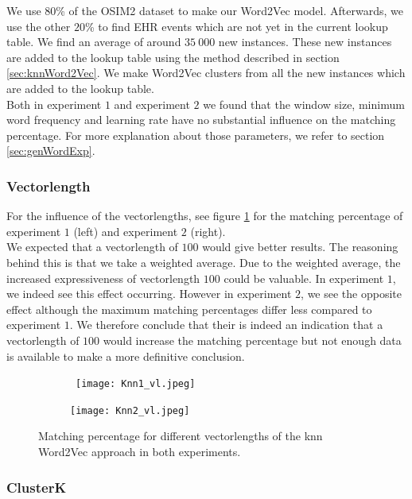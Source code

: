 We use $80$\% of the OSIM2 dataset to make our Word2Vec model. Afterwards, we use the other $20$\% to find EHR events which are not yet in the current lookup table. We find an average of around $35 \ 000$ new instances. These new instances are added to the lookup table using the method described in section \ref{sec:knnWord2Vec}. We make Word2Vec clusters from all the new instances which are added to the lookup table. \\
Both in experiment $1$ and experiment $2$ we found that the window size, minimum word frequency and learning rate have no substantial influence on the matching percentage. For more explanation about those parameters, we refer to section \ref{sec:genWordExp}. \\

\subsubsection{Vectorlength}

For the influence of the vectorlengths, see figure \ref{fig:knn_vl} for the matching percentage of experiment $1$ (left) and experiment $2$ (right). \\
We expected that a vectorlength of $100$ would give better results. The reasoning behind this is that we take a weighted average. Due to the weighted average, the increased expressiveness of vectorlength $100$ could be valuable. In experiment $1$, we indeed see this effect occurring. However in experiment $2$, we see the opposite effect although the maximum matching percentages differ less compared to experiment $1$. We therefore conclude that their is indeed an indication that a vectorlength of $100$ would increase the matching percentage but not enough data is available to make a more definitive conclusion.

\begin{figure}[!htb]
	\centering
	\begin{subfigure}[b]{.49\textwidth}\
		\texttt{[image: Knn1\_vl.jpeg]}
	\end{subfigure}
	\begin{subfigure}[b]{.49\textwidth}
		\texttt{[image: Knn2\_vl.jpeg]}
	\end{subfigure}
	\caption{Matching percentage for different vectorlengths of the knn Word2Vec 	approach in both experiments.}
	\label{fig:knn_vl}
\end{figure}

\subsubsection{ClusterK}


